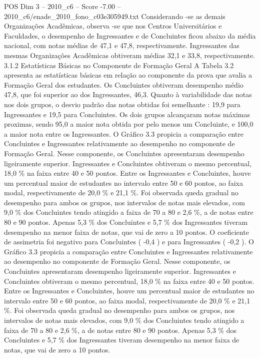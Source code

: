 \begin{textsample}{POS Dim 3 – 2010\_c6 – Score -7.00 – 2010\_c6/enade\_2010\_fono\_c03e305949.txt}
Considerando -se as demais Organizações Acadêmicas, observa -se que nos Centros Universitários e Faculdades, o desempenho de Ingressantes e de Concluintes ficou abaixo da média nacional, com notas médias de 47,1 e 47,8, respectivamente.
Ingressantes das mesmas Organizações Acadêmicas obtiveram médias 32,1 e 33,8, respectivamente. 3.1.2 Estatísticas Básicas no Componente de Formação Geral A Tabela 3.2 apresenta as estatísticas básicas em relação ao componente da prova que avalia a Formação Geral dos estudantes.
Os Concluintes obtiveram desempenho médio 47,8, que foi superior ao dos Ingressantes, 46,3.
Quanto à variabilidade das notas nos dois grupos, o desvio padrão das notas obtidas foi semelhante : 19,9 para Ingressantes e 19,5 para Concluintes.
Os dois grupos alcançaram notas máximas proximas, sendo 95,0 a maior nota obtida por pelo menos um Concluinte, e 100,0 a maior nota entre os Ingressantes.
O Gráfico 3.3 propicia a comparação entre Concluintes e Ingressantes relativamente ao desempenho no componente de Formação Geral.
Nesse componente, os Concluintes apresentaram desempenho ligeiramente superior.
Ingressantes e Concluintes obtiveram o mesmo percentual, 18,0 \% na faixa entre 40 e 50 pontos.
Entre os Ingressantes e Concluintes, houve um percentual maior de estudantes no intervalo entre 50 e 60 pontos, ao faixa modal, respectivamente de 20,0 \% e 21,1 \%.
Foi observada queda gradual no desempenho para ambos os grupos, nos intervalos de notas mais elevados, com 9,0 \% dos Concluintes tendo atingido a faixa de 70 a 80 e 2,6 \%, a de notas entre 80 e 90 pontos.
Apenas 5,3 \% dos Concluintes e 5,7 \% dos Ingressantes tiveram desempenho na menor faixa de notas, que vai de zero a 10 pontos.
O coeficiente de assimetria foi negativo para Concluintes ( -0,4 ) e para Ingressantes ( -0,2 ).
O Gráfico 3.3 propicia a comparação entre Concluintes e Ingressantes relativamente ao desempenho no componente de Formação Geral.
Nesse componente, os Concluintes apresentaram desempenho ligeiramente superior.
Ingressantes e Concluintes obtiveram o mesmo percentual, 18,0 \% na faixa entre 40 e 50 pontos.
Entre os Ingressantes e Concluintes, houve um percentual maior de estudantes no intervalo entre 50 e 60 pontos, ao faixa modal, respectivamente de 20,0 \% e 21,1 \%.
Foi observada queda gradual no desempenho para ambos os grupos, nos intervalos de notas mais elevados, com 9,0 \% dos Concluintes tendo atingido a faixa de 70 a 80 e 2,6 \%, a de notas entre 80 e 90 pontos.
Apenas 5,3 \% dos Concluintes e 5,7 \% dos Ingressantes tiveram desempenho na menor faixa de notas, que vai de zero a 10 pontos.

\end{textsample}
